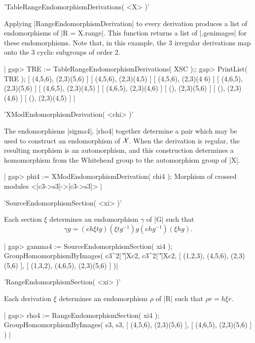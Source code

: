 'TableRangeEndomorphismDerivations( <X> )'

Applying |RangeEndomorphismDerivation|  to every derivation produces a
list of endomorphisms of |R =  X.range|.  This function returns a list
of |.genimages| for these endomorphisms.  Note  that, in this example,
the 3  irregular derivations map onto  the 3 cyclic subgroups of order
2.

|    gap> TRE := TableRangeEndomorphismDerivations( XSC );;
    gap> PrintList( TRE );
    [ (4,5,6), (2,3)(5,6) ]
    [ (4,5,6), (2,3)(4,5) ]
    [ (4,5,6), (2,3)(4 6) ]
    [ (4,6,5), (2,3)(5,6) ]
    [ (4,6,5), (2,3)(4,5) ]
    [ (4,6,5), (2,3)(4,6) ]
    [ (), (2,3)(5,6) ]
    [ (), (2,3)(4,6) ]
    [ (), (2,3)(4,5) ]  |

%

'XModEndomorphismDerivation( <chi> )'

The endomorphisms |sigma4|, |rho4| together determine a pair which may
be used   to construct   an endomorphism  of  ${\cal  X}$.    When the
derivation is regular, the resulting  morphism is an automorphism, and
this construction determines a  homomorphism from the  Whitehead group
to the automorphism group of |X|.

|    gap> phi4 := XModEndomorphismDerivation( chi4 );
    Morphism of crossed modules <[c3->s3]->[c3->s3]>  |

%

'SourceEndomorphismSection( <xi> )'

Each section  $\xi$  determines an  endomorphism $\gamma$  of |G| such
that $$\gamma g =  (e h \xi t g)(\xi  t g^{-1}) g (e  h g^{-1}) (\xi h
g).$$

|    gap> gamma4 := SourceEndomorphismSection( xi4 );
    GroupHomomorphismByImages( c3^2|'\|'|Xc2, c3^2|'\|'|Xc2,
      [ (1,2,3), (4,5,6), (2,3)(5,6) ], [ (1,3,2), (4,6,5), (2,3)(5,6) ] )|

%

'RangeEndomorphismSection( <xi> )'

Each derivation $\xi$ determines  an  endomorphism $\rho$ of |R|  such
that $\rho r = h \xi r$.

|    gap> rho4 := RangeEndomorphismSection( xi4 );
    GroupHomomorphismByImages( s3, s3, [ (4,5,6), (2,3)(5,6) ], 
      [ (4,6,5), (2,3)(5,6) ] )   |

